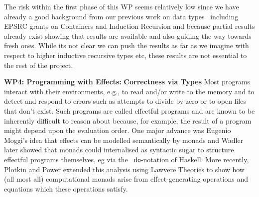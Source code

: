 \documentclass[a4paper,11pt]{article}
\begin{document}
The risk within the first phase of this WP seems relatively low since we
have already a good background from our previous work on data
types~\cite{II etc} including EPSRC grants on Containers and Induction
Recursion and because partial results already exist showing that
results are available and also guiding the way towards fresh
ones. While its not clear we can push the results as far as we imagine
with respect to higher inductive recursive types etc, these results
are not essential to the rest of the project.


{\bf WP4: Programming with Effects:} {\bf Correctness via Types} Most
programs interact with their environments, e.g., to read and/or write
to the memory and to detect and respond to errors such as attempts to
divide by zero or to open files that don’t exist. Such programs are
called effectful programs and are known to be inherently difficult to
reason about because, for example, the result of a program might
depend upon the evaluation order. One major advance was Eugenio
Moggi’s idea that effects can be modelled semantically by monads and
Wadler later showed that monads could internalised as syntactic sugar
to structure effectful programs themselves, eg via the {\tt
  do}-notation of Haskell. More recently, Plotkin and Power extended
this analysis using Lawvere Theories to show how (all most all)
computational monads arise from effect-generating operations and
equations which these operations satisfy.
\end{document}
